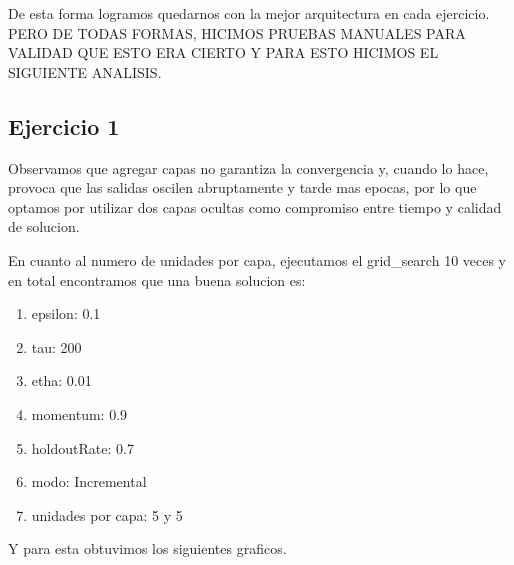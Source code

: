 De esta forma logramos quedarnos con la mejor arquitectura en cada ejercicio. PERO DE TODAS FORMAS, HICIMOS PRUEBAS MANUALES PARA VALIDAD QUE ESTO ERA CIERTO Y PARA ESTO HICIMOS EL SIGUIENTE ANALISIS.
\subsection{Ejercicio 1}

Observamos que agregar capas no garantiza la convergencia y, cuando lo hace, provoca que las salidas oscilen abruptamente y tarde mas epocas, por lo que optamos por utilizar dos capas ocultas como compromiso entre tiempo y calidad de solucion. 

En cuanto al numero de unidades por capa, ejecutamos el grid\_search 10 veces y en total encontramos que una buena solucion es:

\begin{enumerate}
\item epsilon: 0.1
\item tau: 200
\item etha: 0.01
\item momentum: 0.9
\item holdoutRate: 0.7
\item modo: Incremental
\item unidades por capa: 5 y 5
\end{enumerate}

Y para esta obtuvimos los siguientes graficos.


